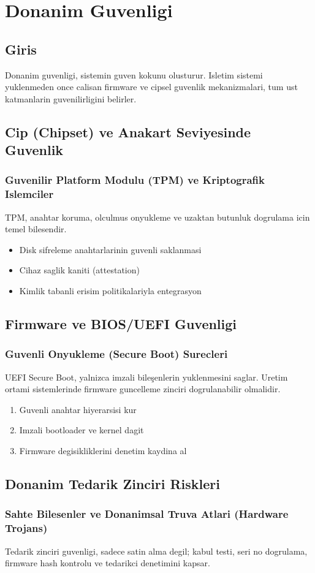 ﻿\chapter{Donanim Guvenligi}

\section*{Giris}
Donanim guvenligi, sistemin guven kokunu olusturur. Isletim sistemi yuklenmeden once calisan firmware ve cipsel guvenlik mekanizmalari, tum ust katmanlarin guvenilirligini belirler.

\section{Cip (Chipset) ve Anakart Seviyesinde Guvenlik}
\subsection{Guvenilir Platform Modulu (TPM) ve Kriptografik Islemciler}
TPM, anahtar koruma, olculmus onyukleme ve uzaktan butunluk dogrulama icin temel bilesendir.
\begin{itemize}
    \item Disk sifreleme anahtarlarinin guvenli saklanmasi
    \item Cihaz saglik kaniti (attestation)
    \item Kimlik tabanli erisim politikalariyla entegrasyon
\end{itemize}

\section{Firmware ve BIOS/UEFI Guvenligi}
\subsection{Guvenli Onyukleme (Secure Boot) Surecleri}
UEFI Secure Boot, yalnizca imzali bileşenlerin yuklenmesini saglar. Uretim ortami sistemlerinde firmware guncelleme zinciri dogrulanabilir olmalidir.
\begin{enumerate}
    \item Guvenli anahtar hiyerarsisi kur
    \item Imzali bootloader ve kernel dagit
    \item Firmware degisikliklerini denetim kaydina al
\end{enumerate}

\section{Donanim Tedarik Zinciri Riskleri}
\subsection{Sahte Bilesenler ve Donanimsal Truva Atlari (Hardware Trojans)}
Tedarik zinciri guvenligi, sadece satin alma degil; kabul testi, seri no dogrulama, firmware hash kontrolu ve tedarikci denetimini kapsar.


